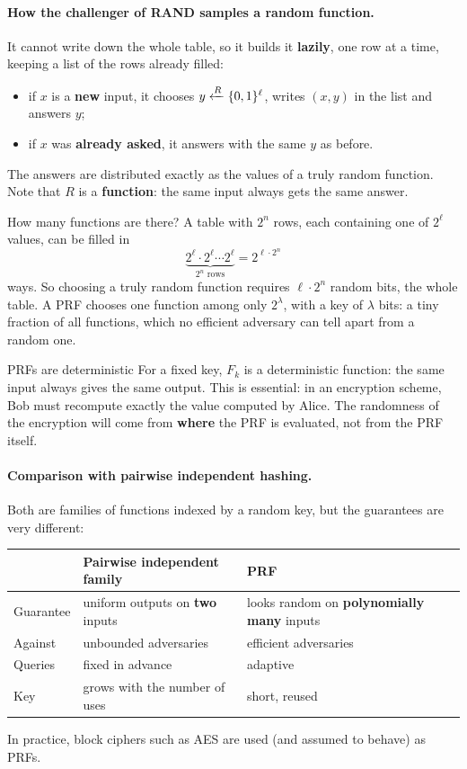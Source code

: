\paragraph{How the challenger of RAND samples a random function.} It cannot write down the whole table, so it builds it \textbf{lazily}, one row at a time, keeping a list of the rows already filled:
\begin{itemize}
  \item if $x$ is a \textbf{new} input, it chooses $y \xleftarrow{R} \{0,1\}^\ell$, writes $(x, y)$ in the list and answers $y$;
  \item if $x$ was \textbf{already asked}, it answers with the same $y$ as before.
\end{itemize}
The answers are distributed exactly as the values of a truly random function. Note that $R$ is a \textbf{function}: the same input always gets the same answer.

\begin{framedobs}{How many functions are there?}
  A table with $2^n$ rows, each containing one of $2^\ell$ values, can be filled in
  \[
    \underbrace{2^\ell \cdot 2^\ell \cdots 2^\ell}_{2^n \text{ rows}} = 2^{\ell \cdot 2^n}
  \]
  ways. So choosing a truly random function requires $\ell \cdot 2^n$ random bits, the whole table. A PRF chooses one function among only $2^\lambda$, with a key of $\lambda$ bits: a tiny fraction of all functions, which no efficient adversary can tell apart from a random one.
\end{framedobs}

\begin{framedobs}{PRFs are deterministic}
  For a fixed key, $F_k$ is a deterministic function: the same input always gives the same output. This is essential: in an encryption scheme, Bob must recompute exactly the value computed by Alice. The randomness of the encryption will come from \textbf{where} the PRF is evaluated, not from the PRF itself.
\end{framedobs}

\paragraph{Comparison with pairwise independent hashing.} Both are families of functions indexed by a random key, but the guarantees are very different:

\begin{table}[H]
  \centering
  \small
  \begin{tabularx}{\textwidth}{@{}lXX@{}}
    \toprule
    & \textbf{Pairwise independent family} & \textbf{PRF} \\
    \midrule
    Guarantee & uniform outputs on \textbf{two} inputs & looks random on \textbf{polynomially many} inputs \\
    Against & unbounded adversaries & efficient adversaries \\
    Queries & fixed in advance & adaptive \\
    Key & grows with the number of uses & short, reused \\
    \bottomrule
  \end{tabularx}
\end{table}

In practice, block ciphers such as AES are used (and assumed to behave) as PRFs.
